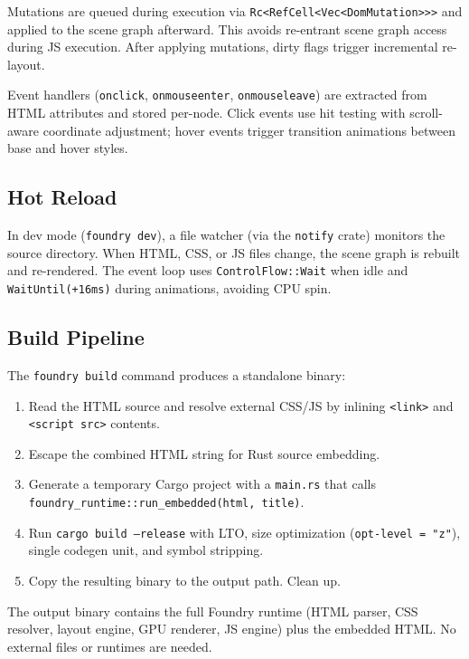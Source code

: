 \documentclass[11pt,twocolumn]{article}
\begin{document}
Mutations are queued during execution via \texttt{Rc<RefCell<Vec<DomMutation>>>} and applied to the scene graph afterward. This avoids re-entrant scene graph access during JS execution. After applying mutations, dirty flags trigger incremental re-layout.

Event handlers (\texttt{onclick}, \texttt{onmouseenter}, \texttt{onmouseleave}) are extracted from HTML attributes and stored per-node. Click events use hit testing with scroll-aware coordinate adjustment; hover events trigger transition animations between base and hover styles.

\subsection{Hot Reload}

In dev mode (\texttt{foundry dev}), a file watcher (via the \texttt{notify} crate) monitors the source directory. When HTML, CSS, or JS files change, the scene graph is rebuilt and re-rendered. The event loop uses \texttt{ControlFlow::Wait} when idle and \texttt{WaitUntil(+16ms)} during animations, avoiding CPU spin.

\subsection{Build Pipeline}

The \texttt{foundry build} command produces a standalone binary:

\begin{enumerate}
\item Read the HTML source and resolve external CSS/JS by inlining \texttt{<link>} and \texttt{<script src>} contents.
\item Escape the combined HTML string for Rust source embedding.
\item Generate a temporary Cargo project with a \texttt{main.rs} that calls \texttt{foundry\_runtime::run\_embedded(html, title)}.
\item Run \texttt{cargo build --release} with LTO, size optimization (\texttt{opt-level = "z"}), single codegen unit, and symbol stripping.
\item Copy the resulting binary to the output path. Clean up.
\end{enumerate}

The output binary contains the full Foundry runtime (HTML parser, CSS resolver, layout engine, GPU renderer, JS engine) plus the embedded HTML. No external files or runtimes are needed.
\end{document}
